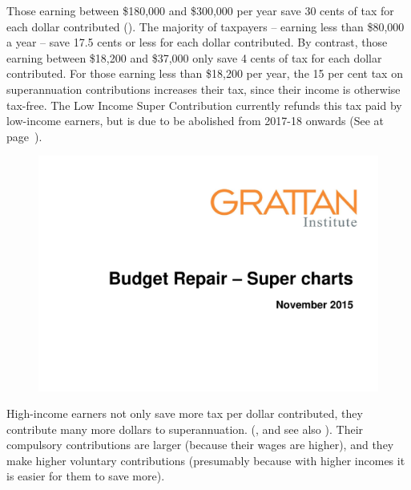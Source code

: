 \documentclass{grattanAlpha}
\begin{document}
Those earning between \$180,000 and \$300,000 per year save 30 cents of tax for each dollar contributed ().  The majority of taxpayers – earning less than \$80,000 a year – save 17.5 cents or less for each dollar contributed. By contrast, those earning between \$18,200 and \$37,000 only save 4 cents of tax for each dollar contributed.  For those earning less than \$18,200 per year, the 15 per cent tax on superannuation contributions increases their tax, since their income is otherwise tax-free. The Low Income Super Contribution currently refunds this tax paid by low-income earners, but is due to be abolished from 2017-18 onwards (See  at page~\pageref{sec:SUPER-LISC-to-be-abolished}).

\begin{figure}
\label{fig:SUPER-4-2}
\includegraphics[width=\columnwidth,page=20]{super-atlas/PPTX.pdf}

\end{figure}

High-income earners not only save more tax per dollar contributed, they contribute many more dollars to superannuation. (, and see also ). Their compulsory contributions are larger (because their wages are higher), and they make higher voluntary contributions (presumably because with higher incomes it is easier for them to save more). 
\end{document}
